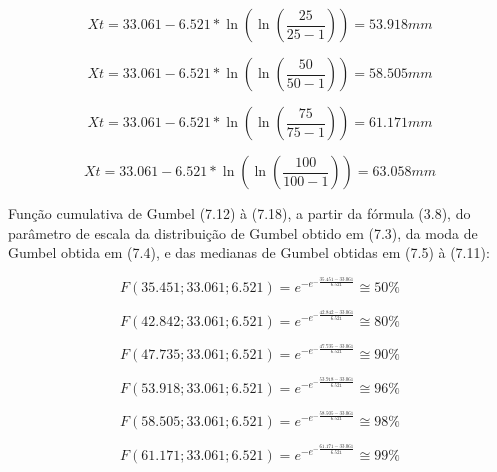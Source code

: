 \begin{equation}
Xt = 33.061 - 6.521 * \ln{\left(\ln{\left(\frac{25}{25 - 1}\right)}\right)} = 53.918 mm
\end{equation}

\begin{equation}
Xt = 33.061 - 6.521 * \ln{\left(\ln{\left(\frac{50}{50 - 1}\right)}\right)} = 58.505 mm
\end{equation}

\begin{equation}
Xt = 33.061 - 6.521 * \ln{\left(\ln{\left(\frac{75}{75 - 1}\right)}\right)} = 61.171 mm
\end{equation}

\begin{equation}
Xt = 33.061 - 6.521 * \ln{\left(\ln{\left(\frac{100}{100 - 1}\right)}\right)} = 63.058 mm
\end{equation}

\newpage

Função cumulativa de Gumbel (7.12) à (7.18), a partir da fórmula (3.8), do parâmetro de escala da distribuição de Gumbel obtido em (7.3), da moda de Gumbel obtida em (7.4), e das medianas de Gumbel obtidas em (7.5) à (7.11):\bigskip

\begin{equation}
F(35.451; 33.061; 6.521) = e^{- e^{- \frac{35.451 - 33.061}{6.521}}} \cong 50\% 
\end{equation}

\begin{equation}
F(42.842; 33.061; 6.521) = e^{- e^{- \frac{42.842 - 33.061}{6.521}}} \cong 80\% 
\end{equation}

\begin{equation}
F(47.735; 33.061; 6.521) = e^{- e^{- \frac{47.735 - 33.061}{6.521}}} \cong 90\% 
\end{equation}

\begin{equation}
F(53.918; 33.061; 6.521) = e^{- e^{- \frac{53.918 - 33.061}{6.521}}} \cong 96\% 
\end{equation}

\begin{equation}
F(58.505; 33.061; 6.521) = e^{- e^{- \frac{58.505 - 33.061}{6.521}}} \cong 98\% 
\end{equation}

\begin{equation}
F(61.171; 33.061; 6.521) = e^{- e^{- \frac{61.171 - 33.061}{6.521}}} \cong 99\% 
\end{equation}

